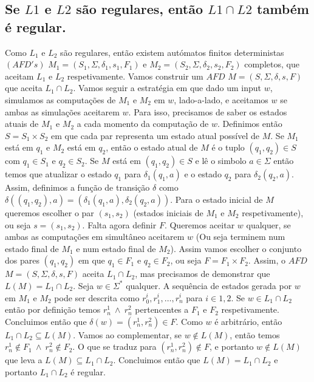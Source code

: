 \subsection{Se $L1$ e $L2$ são regulares, então $L1 \cap L2$ também é regular.}

\begin{spacing}{1.5}
  Como $L_1$ e $L_2$ são regulares, então existem autómatos finitos deterministas
  $(AFD's)$ $M_1 = (S_1, \Sigma, \delta_1, s_1, F_1)$ e $M_2 = (S_2, \Sigma, \delta_2, s_2, F_2)$ completos, que aceitam $L_1$ e $L_2$ respetivamente. Vamos construir um $AFD$ $M = (S, \Sigma, \delta, s, F)$ que aceita $L_1 \cap L_2$.
  Vamos seguir a estratégia em que dado um input $w$, simulamos as computações de $M_1$ e $M_2$ em $w$, lado-a-lado, e aceitamos $w$ se ambas as simulações aceitarem $w$. Para isso, precisamos de saber os estados atuais de $M_1$ e $M_2$ a cada momento da computação de $w$. Definimos então $S = S_1 \times S_2$ em que cada par representa um estado atual possível de $M$. Se $M_1$ está em $q_1$ e $M_2$ está em $q_2$, então o estado atual de $M$ é o tuplo $(q_1, q_2) \in S$ com $q_1 \in S_1$ e $q_2 \in S_2$. Se $M$ está em $(q_1,q_2) \in S$ e lê o simbolo $a \in \Sigma$ então temos que atualizar o estado $q_1$ para $\delta_1(q_1, a)$ e o estado $q_2$ para $\delta_2(q_2, a)$. Assim, definimos a função de transição $\delta$ como $\delta((q_1,q_2), a) = (\delta_1(q_1, a), \delta_2(q_2, a))$. Para o estado inicial de $M$ queremos escolher o par $(s_1,s_2)$ (estados iniciais de $M_1$ e $M_2$ respetivamente), ou seja $s = (s_1,s_2)$. Falta agora definir $F$. Queremos aceitar $w$ qualquer, se ambas as computações em simultâneo aceitarem $w$ (Ou seja terminem num estado final de $M_1$ e num estado final de $M_2$). Assim vamos escolher o conjunto dos pares $(q_1,q_2)$ em que $q_1 \in F_1$ e $q_2 \in F_2$, ou seja $F = F_1 \times F_2$. Assim, o $AFD$ $M = (S, \Sigma, \delta, s, F)$ aceita $L_1 \cap L_2$, mas precisamos de demonstrar que $L(M) = L_1 \cap L_2$. Seja $w \in \Sigma^{*}$ qualquer. A sequência de estados gerada por $w$ em $M_1$ e $M_2$ pode ser descrita como $r_0^{i}, r_1^{i}, \hdots, r_n^{i}$ para $i \in {1,2}$. Se $w \in L_1 \cap L_2$ então por definição temos $r_n^{1} \ \wedge \ r_n^{2}$ pertencentes a $F_1$ e $F_2$ respetivamente. Concluimos então que $\delta(w) = (r_n^{1},r_n^{2}) \in F$. Como $w$ é arbitrário, então $L_1 \cap L_2 \subseteq L(M)$. Vamos ao complementar, se $w \notin L(M)$, então temos $r_n^{1} \notin F_1 \ \wedge \ r_n^{2} \notin F_2$. O que se traduz para $(r_n^{1},r_n^{2}) \notin F$, e portanto $w \notin L(M)$ que leva a $L(M) \subseteq L_1 \cap L_2$. Concluimos então que $L(M) = L_1 \cap L_2$ e portanto $L_1 \cap L_2$ é regular.
\end{spacing}